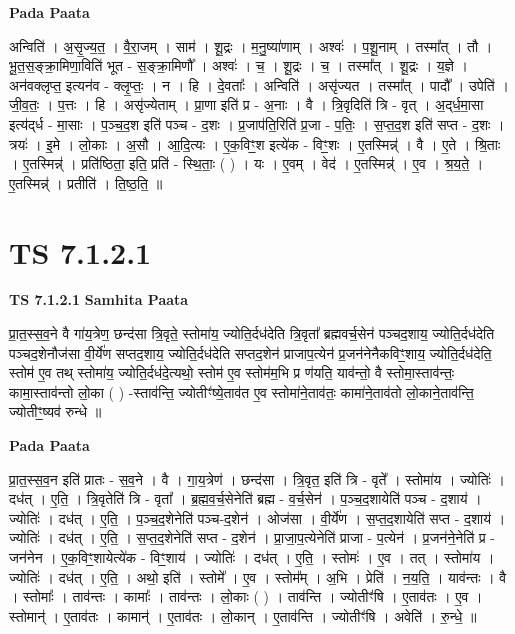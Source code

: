 \documentclass[17pt]{extarticle}
\begin{document}
\textbf{Pada Paata} \newline

अन्विति॑ । अ॒सृ॒ज्य॒त॒ । वै॒रा॒जम् । साम॑ । शू॒द्रः । म॒नु॒ष्या॑णाम् । अश्वः॑ । प॒शू॒नाम् । तस्मा᳚त् । तौ । भू॒त॒स॒ङ्क्रा॒मिणा॒विति॑ भूत - स॒ङ्क्रा॒मिणौ᳚ । अश्वः॑ । च॒ । शू॒द्रः । च॒ । तस्मा᳚त् । शू॒द्रः । य॒ज्ञे । अन॑वक्लृप्त॒ इत्यन॑व - क्लृ॒प्तः॒ । न । हि । दे॒वताः᳚ । अन्विति॑ । असृ॑ज्यत । तस्मा᳚त् । पादौ᳚ । उपेति॑ । जी॒व॒तः॒ । प॒त्तः । हि । असृ॑ज्येताम् । प्रा॒णा इति॑ प्र - अ॒नाः । वै । त्रि॒वृदिति॑ त्रि - वृत् । अ॒द्‌र्ध॒मा॒सा इत्य॑द्‌र्ध - मा॒साः । प॒ञ्च॒द॒श इति॑ पञ्च - द॒शः । प्र॒जाप॑ति॒रिति॑ प्र॒जा - प॒तिः॒ । स॒प्त॒द॒श इति॑ सप्त - द॒शः । त्रयः॑ । इ॒मे । लो॒काः । अ॒सौ । आ॒दि॒त्यः । ए॒क॒विꣳ॒॒श इत्ये॑क - विꣳ॒॒शः । ए॒तस्मिन्न्॑ । वै । ए॒ते । श्रि॒ताः । ए॒तस्मिन्न्॑ । प्रति॑ष्ठिता॒ इति॒ प्रति॑ - स्थि॒ताः॒ ( ) । यः । ए॒वम् । वेद॑ । ए॒तस्मिन्न्॑ । ए॒व । श्र॒य॒ते॒ । ए॒तस्मिन्न्॑ । प्रतीति॑ । ति॒ष्ठ॒ति॒ ॥  \newline




\section*{ TS 7.1.2.1 }

\textbf{TS 7.1.2.1 } \newline
\textbf{Samhita Paata} \newline

प्रा॒त॒स्स॒व॒ने वै गा॑य॒त्रेण॒ छन्द॑सा त्रि॒वृते॒ स्तोमा॑य॒ ज्योति॒र्दध॑देति त्रि॒वृता᳚ ब्रह्मवर्च॒सेन॑ पञ्चद॒शाय॒ ज्योति॒र्दध॑देति पञ्चद॒शेनौज॑सा वी॒र्ये॑ण सप्तद॒शाय॒ ज्योति॒र्दध॑देति सप्तद॒शेन॑ प्राजाप॒त्येन॑ प्र॒जन॑नेनैकविꣳ॒॒शाय॒ ज्योति॒र्दध॑देति॒ स्तोम॑ ए॒व तथ् स्तोमा॑य॒ ज्योति॒र्दध॑दे॒त्यथो॒ स्तोम॑ ए॒व स्तोम॑म॒भि प्र ण॑यति॒ याव॑न्तो॒ वै स्तोमा॒स्ताव॑न्तः॒ कामा॒स्ताव॑न्तो लो॒का ( ) -स्ताव॑न्ति॒ ज्योतीꣳ॑ष्ये॒ताव॑त ए॒व स्तोमा॑ने॒ताव॑तः॒ कामा॑ने॒ताव॑तो लो॒काने॒ताव॑न्ति॒ ज्योतीꣳ॒॒ष्यव॑ रुन्धे ॥ \newline

\textbf{Pada Paata} \newline

प्रा॒त॒स्स॒व॒न इति॑ प्रातः - स॒व॒ने । वै । गा॒य॒त्रेण॑ । छन्द॑सा । त्रि॒वृत॒ इति॑ त्रि - वृते᳚ । स्तोमा॑य । ज्योतिः॑ । दध॑त् । ए॒ति॒ । त्रि॒वृतेति॑ त्रि - वृता᳚ । ब्र॒ह्म॒व॒र्च॒सेनेति॑ ब्रह्म - व॒र्च॒सेन॑ । प॒ञ्च॒द॒शायेति॑ पञ्च - द॒शाय॑ । ज्योतिः॑ । दध॑त् । ए॒ति॒ । प॒ञ्च॒द॒शेनेति॑ पञ्च-द॒शेन॑ । ओज॑सा । वी॒र्ये॑ण । स॒प्त॒द॒शायेति॑ सप्त - द॒शाय॑ । ज्योतिः॑ । दध॑त् । ए॒ति॒ । स॒प्त॒द॒शेनेति॑ सप्त - द॒शेन॑ । प्रा॒जा॒प॒त्येनेति॑ प्राजा - प॒त्येन॑ । प्र॒जन॑ने॒नेति॑ प्र - जन॑नेन । ए॒क॒विꣳ॒॒शायेत्ये॑क - विꣳ॒॒शाय॑ । ज्योतिः॑ । दध॑त् । ए॒ति॒ । स्तोमः॑ । ए॒व । तत् । स्तोमा॑य । ज्योतिः॑ । दध॑त् । ए॒ति॒ । अथो॒ इति॑ । स्तोमे᳚ । ए॒व । स्तोम᳚म् । अ॒भि । प्रेति॑ । न॒य॒ति॒ । याव॑न्तः । वै । स्तोमाः᳚ । ताव॑न्तः । कामाः᳚ । ताव॑न्तः । लो॒काः ( ) । ताव॑न्ति । ज्योतीꣳ॑षि । ए॒ताव॑तः । ए॒व । स्तोमान्॑ । ए॒ताव॑तः । कामान्॑ । ए॒ताव॑तः । लो॒कान् । ए॒ताव॑न्ति । ज्योतीꣳ॑षि । अवेति॑ । रु॒न्धे॒ ॥  \newline
\end{document}
